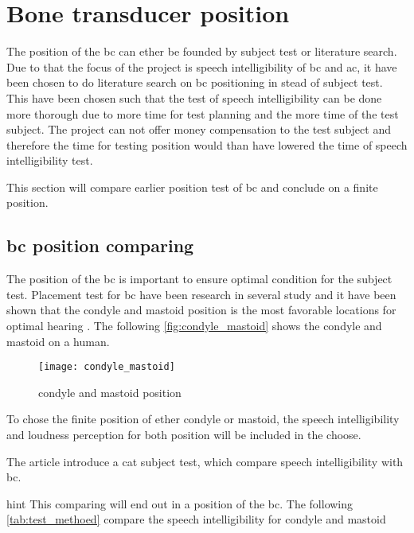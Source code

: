 \section{Bone transducer position}

The position of the \gls{bc} can ether be founded by subject test or literature search. Due to that the focus of the project is speech intelligibility of \gls{bc} and \gls{ac}, it have been chosen to do literature search on \gls{bc} positioning in stead of subject test. This have been chosen such that the test of speech intelligibility can be done more thorough due to more time for test planning and the more time of the test subject. The project can not offer money compensation to the test subject and therefore the time for testing position would than have lowered the time of speech intelligibility test. 

This section will compare earlier position test of \gls{bc} and conclude on a finite position.

\subsection{\gls{bc} position comparing}
The position of the \gls{bc} is important to ensure optimal condition for the subject test. Placement test for \gls{bc} have been research in several study and it have been shown that the condyle and mastoid position is the most favorable locations for optimal hearing \citep{cat_test}. The following \autoref{fig:condyle_mastoid} shows the  condyle and mastoid on a human.

\begin{figure}[H]
	\centering
		\texttt{[image: condyle\_mastoid]}
		\caption{condyle and mastoid position \citep{cat_test}}
		\label{fig:condyle_mastoid}
\end{figure}

To chose the finite position of ether condyle or mastoid, the speech intelligibility and loudness perception for both position will be included in the choose. 


The article \citep{cat_test} introduce a \gls{cat} subject test, which compare  speech intelligibility with \gls{bc}. 



\gls{hint} This comparing will end out in a position of the \gls{bc}. The following \autoref{tab:test_methoed} compare the speech intelligibility for condyle and mastoid



